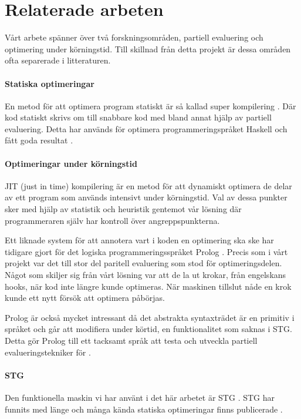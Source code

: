 \documentclass[Rapport]{subfiles}
\begin{document}
\section{Relaterade arbeten}

Vårt arbete spänner över två forskningsområden, partiell evaluering
och optimering under körningstid. Till skillnad från detta projekt 
är dessa områden ofta separerade i litteraturen.

\paragraph{Statiska optimeringar} 
En metod för att optimera program statiskt är så kallad super kompilering \cite{srensen1995algorithm}. Där kod statiskt skrivs om till snabbare kod med bland annat hjälp av partiell evaluering. Detta har används för optimera programmeringspråket Haskell och fått goda resultat \cite{mitchell2007supercompiler}.


\paragraph{Optimeringar under körningstid}
JIT (just in time) kompilering är en metod för att dynamiskt optimera
de delar av ett program som används intensivt under körningstid. Val av
dessa punkter sker med hjälp av statistik och heuristik gentemot vår
lösning där programmeraren själv har kontroll över angreppspunkterna. 

Ett liknade system för att annotera vart i koden en optimering ska ske har tidigare gjort för det logiska programmeringsspråket Prolog \cite{bolz-automatic}.
Precis som i vårt projekt var det till stor del paritell evaluering som stod för optimeringsdelen. Något som skiljer sig från vårt lösning var att de la ut krokar, från engelskans hooks, när kod inte längre kunde optimeras. När maskinen tillslut nåde en krok kunde ett nytt försök att optimera påbörjas. 

Prolog är också mycket intressant då det abstrakta syntaxträdet är en primitiv i språket och går att modifiera under körtid, en funktionalitet som saknas i STG.
Detta gör Prolog till ett tacksamt språk att testa och utveckla partiell evalueringstekniker för \cite{ecce}.



\paragraph{STG}
Den funktionella maskin vi har använt i det här arbetet är 
STG \cite{stg}. STG har funnits med länge och många kända statiska optimeringar finns publicerade \cite{santos}.
\end{document}
